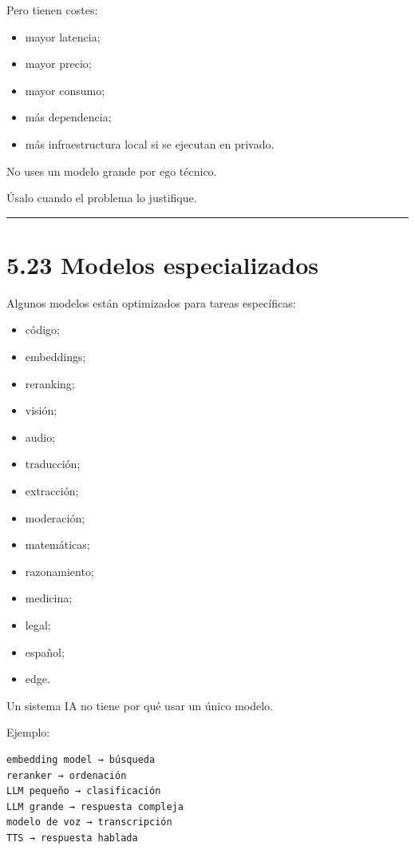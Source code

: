 Pero tienen costes:

\begin{itemize}
\tightlist
\item
  mayor latencia;
\item
  mayor precio;
\item
  mayor consumo;
\item
  más dependencia;
\item
  más infraestructura local si se ejecutan en privado.
\end{itemize}

No uses un modelo grande por ego técnico.

Úsalo cuando el problema lo justifique.

\begin{center}\rule{0.5\linewidth}{0.5pt}\end{center}

\section{5.23 Modelos especializados}\label{modelos-especializados}

Algunos modelos están optimizados para tareas específicas:

\begin{itemize}
\tightlist
\item
  código;
\item
  embeddings;
\item
  reranking;
\item
  visión;
\item
  audio;
\item
  traducción;
\item
  extracción;
\item
  moderación;
\item
  matemáticas;
\item
  razonamiento;
\item
  medicina;
\item
  legal;
\item
  español;
\item
  edge.
\end{itemize}

Un sistema IA no tiene por qué usar un único modelo.

Ejemplo:

\begin{lstlisting}
embedding model → búsqueda
reranker → ordenación
LLM pequeño → clasificación
LLM grande → respuesta compleja
modelo de voz → transcripción
TTS → respuesta hablada
\end{lstlisting}

